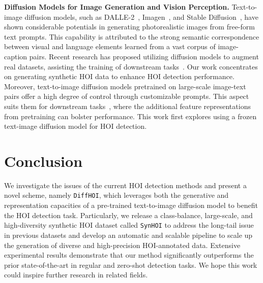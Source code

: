 \documentclass{article}
\begin{document}
\textbf{Diffusion Models for Image Generation and Vision Perception.}
Text-to-image diffusion models, such as DALLE-2~\cite{ramesh2022hierarchical}, Imagen~\cite{saharia2022photorealistic}, and Stable Diffusion~\cite{rombach2022high}, have shown considerable potentials in generating photorealistic images from free-form text prompts. This capability is attributed to the strong semantic correspondence between visual and language elements learned from a vast corpus of image-caption pairs. Recent research has proposed utilizing diffusion models to augment real datasets, assisting the training of downstream tasks~\cite{shiparddiversity,trabucco2023effective,bansal2023leaving,you2023diffusion}. Our work concentrates on generating synthetic HOI data to enhance HOI detection performance.
Moreover, text-to-image diffusion models pretrained on large-scale image-text pairs offer a high degree of control through customizable prompts. This aspect suits them for downstream tasks~\cite{xu2023open,li2023guiding}, where the additional feature representations from pretraining can bolster performance. 
This work first explores using a frozen text-image diffusion model for HOI detection.







 

\section{Conclusion}
We investigate the issues of the current HOI detection methods and present a novel scheme, namely \texttt{DiffHOI}, which leverages both the generative and representation capacities of a pre-trained text-to-image diffusion
model to benefit the HOI detection task. Particularly, we release a class-balance, large-scale, and high-diversity synthetic HOI dataset called \texttt{SynHOI} to address the long-tail issue in previous datasets and develop an automatic and scalable pipeline to
scale up the generation of diverse and high-precision HOI-annotated data. Extensive experimental results demonstrate that our method significantly outperforms the prior state-of-the-art in regular and zero-shot detection tasks. We hope this work could inspire further research in related fields.
 





\end{document}
